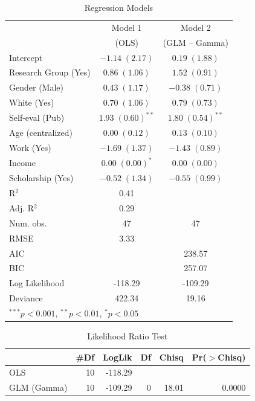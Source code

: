 \documentclass[12pt, english]{article}
\begin{document}
\begin{table}
		\centering
		\caption{Regression Models}
		\label{linear-coefficients}
	
	\begin{tabular}{l c c }
			\hline
			& Model 1 & Model 2 \\
			& (OLS)   & (GLM -- Gamma) \\
			\hline
			Intercept    & $-1.14 \; (2.17)$     & $0.19 \; (1.88)$      \\
			Research Group (Yes) & $0.86 \; (1.06)$      & $1.52 \; (0.91)$      \\
			Gender (Male)  & $0.43 \; (1.17)$      & $-0.38 \; (0.71)$     \\
			White (Yes)    & $0.70 \; (1.06)$      & $0.79 \; (0.73)$      \\
			Self-eval (Pub)    & $1.93 \; (0.60)^{**}$ & $1.80 \; (0.54)^{**}$ \\
			Age (centralized)     & $0.00 \; (0.12)$      & $0.13 \; (0.10)$      \\
			Work (Yes)  & $-1.69 \; (1.37)$     & $-1.43 \; (0.89)$     \\
			Income     & $0.00 \; (0.00)^{*}$  & $0.00 \; (0.00)$      \\
			Scholarship (Yes) & $-0.52 \; (1.34)$     & $-0.55 \; (0.99)$     \\
			\hline
			R$^2$          & 0.41                  &                       \\
			Adj. R$^2$     & 0.29                  &                       \\
			Num. obs.      & 47                    & 47                    \\
			RMSE           & 3.33                  &                       \\
			AIC            &                       & 238.57                \\
			BIC            &                       & 257.07                \\
			Log Likelihood & -118.29               & -109.29               \\
			Deviance       & 422.34                & 19.16                 \\
			\hline
			\multicolumn{3}{l}{\scriptsize{$^{***}p<0.001$, $^{**}p<0.01$, $^*p<0.05$}}
		\end{tabular}
	
	
\end{table}

\begin{table}[ht]
	
		\centering
		\caption{Likelihood Ratio Test}
		\label{lrtest}
	
	\begin{tabular}{lrrrrr}
			\hline
			& \#Df & LogLik & Df & Chisq & Pr($>$Chisq) \\ 
			\hline
			OLS & 10 & -118.29 &  &  &  \\ 
			GLM (Gamma) & 10 & -109.29 & 0 & 18.01 & 0.0000 \\   
			\hline
		\end{tabular}
	
\end{table}
\end{document}
